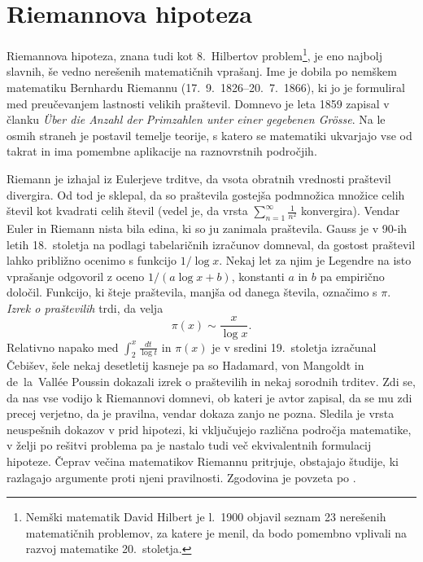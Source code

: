 \documentclass[mat1]{fmfdelo}
\begin{document}
%
\section{Riemannova hipoteza}

Riemannova hipoteza, znana tudi kot 8.~Hilbertov problem\footnote{Nemški matematik David Hilbert je l.~1900 objavil seznam 23 nerešenih matematičnih problemov, za katere je menil, da bodo pomembno vplivali na razvoj matematike 20.~stoletja.}, je eno najbolj slavnih, še vedno nerešenih matematičnih vprašanj. Ime je dobila po nemškem matematiku Bernhardu Riemannu (17.\ 9.\ 1826--20.\ 7.\ 1866), ki jo je formuliral med preučevanjem lastnosti velikih praštevil. Domnevo je leta 1859 zapisal v članku \emph{\"Uber die Anzahl der Primzahlen unter einer gegebenen Gr\"osse}. Na le osmih straneh je postavil temelje teorije, s katero se matematiki ukvarjajo vse od takrat in ima pomembne aplikacije na raznovrstnih področjih. 

Riemann je izhajal iz Eulerjeve trditve, da vsota obratnih vrednosti praštevil divergira. Od tod je sklepal, da so praštevila gostejša podmnožica množice celih števil kot kvadrati celih števil (vedel je, da vrsta $\sum_{n=1}^{\infty} \frac{1}{n^2}$ konvergira).
Vendar Euler in Riemann nista bila edina, ki so ju zanimala praštevila. Gauss je v 90-ih letih 18.~stoletja na podlagi tabelaričnih izračunov domneval, da gostost praštevil lahko približno ocenimo s funkcijo $1/ \log{x}$. Nekaj let za njim je Legendre na isto vprašanje odgovoril z oceno $1/ (a\log{x}+b)$, konstanti $a$ in $b$ pa empirično določil. 
Funkcijo, ki šteje praštevila, manjša od danega števila, označimo s $\pi$. \emph{Izrek o praštevilih} trdi, da velja
\begin{equation}
\pi(x) \sim \frac{x}{\log{x}}.
\end{equation}
%
Relativno napako med $\int_{2}^x \frac{dt}{\log{t}}$ in $\pi(x)$ je v sredini 19.~stoletja izračunal Čebišev, šele nekaj desetletij kasneje pa so Hadamard, von Mangoldt in de~la~Vall\'ee Poussin dokazali izrek o praštevilih in nekaj sorodnih trditev. Zdi se, da nas vse vodijo k Riemannovi domnevi, ob kateri je avtor zapisal, da se mu zdi precej verjetno, da je pravilna, vendar dokaza zanjo ne pozna. Sledila je vrsta neuspešnih dokazov v prid hipotezi, ki vključujejo različna področja matematike, v želji po rešitvi problema pa je nastalo tudi več ekvivalentnih formulacij hipoteze. Čeprav večina matematikov Riemannu pritrjuje, obstajajo študije, ki razlagajo argumente proti njeni pravilnosti.
Zgodovina je povzeta po \cite[poglavje 1.1]{zetafunction}.
%
\end{document}
